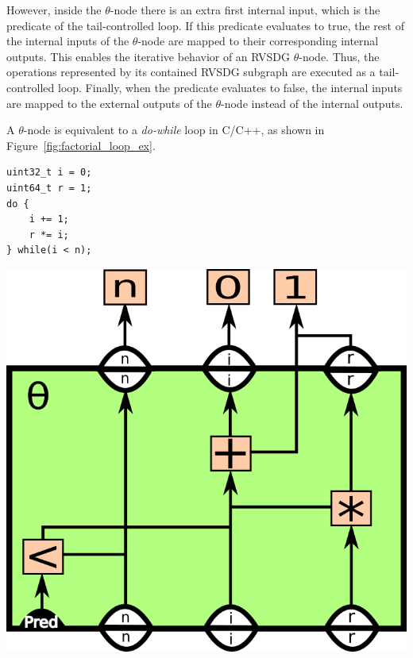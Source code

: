 \begin{itemize}
However, inside the $\theta$-node there is an extra first internal input, which
is the predicate of the tail-controlled loop. If this predicate evaluates to
true, the rest of the internal inputs of the $\theta$-node are mapped to their
corresponding internal outputs. This enables the iterative behavior of an RVSDG
$\theta$-node. Thus, the operations represented by its contained RVSDG subgraph
are executed as a tail-controlled loop. Finally, when the predicate evaluates to
false, the internal inputs are mapped to the external outputs of the
$\theta$-node instead of the internal outputs.

A $\theta$-node is equivalent to a \textit{do-while} loop in C/C++, as shown in
Figure~\ref{fig:factorial_loop_ex}.

\begin{centering}
	\noindent\begin{minipage}{0.36\textwidth}
		\begin{CenteredBox}
		\begin{lstlisting}[style=minipage_customcpp,
label={lst:fig:factorial_loop_ex}, basicstyle=\fontsize{10}{1}]
uint32_t i = 0;
uint64_t r = 1;
do {
	i += 1;
	r *= i;
} while(i < n);
		\end{lstlisting}
		\end{CenteredBox}
	\end{minipage}
	\noindent\begin{minipage}{0.55\textwidth}
		\captionsetup{type=figure}
		\includegraphics[width=\textwidth]{figures/svg/iterative_factorial_ex}
	\end{minipage}
	\label{fig:factorial_loop_ex}
\end{centering}


\end{itemize}
